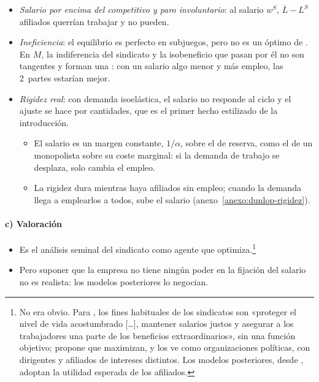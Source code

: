 \documentclass[11pt]{article}
\begin{document}
\begin{itemize}
\item \emph{Salario por encima del competitivo y paro involuntario}: al salario $w^S$, $\overline{L}-L^S$ afiliados querrían trabajar y no pueden.
\item \emph{Ineficiencia}: el equilibrio es perfecto en subjuegos, pero no es un óptimo de . En $M$, la indiferencia del sindicato y la isobeneficio que pasan por él no son tangentes y forman una : con un salario algo menor y más empleo, las 2~partes estarían mejor.
\item \emph{Rigidez real}: con demanda isoelástica, el salario no responde al ciclo y el ajuste se hace por cantidades, que es el primer hecho estilizado de la introducción.
  \begin{itemize}
  \item El salario es un margen constante, $1/\alpha$, sobre el de reserva, como el de un monopolista sobre su coste marginal: si la demanda de trabajo se desplaza, solo cambia el empleo.
  \item La rigidez dura mientras haya afiliados sin empleo; cuando la demanda llega a emplearlos a todos, sube el salario (anexo~\ref{anexo:dunlop-rigidez}).
  \end{itemize}
\end{itemize}

\paragraph{c) Valoración}

\begin{itemize}
\item Es el análisis seminal del sindicato como agente que optimiza.\footnote{No era obvio. Para \textcite[140]{Hicks1932Theory}, los fines habituales de los sindicatos son «proteger el nivel de vida acostumbrado […], mantener salarios justos y asegurar a los trabajadores una parte de los beneficios extraordinarios», sin una función objetivo; \textcite{Dunlop1944Wage} propone que maximizan, y \textcite{Ross1948Trade} los ve como organizaciones políticas, con dirigentes y afiliados de intereses distintos. Los modelos posteriores, desde \textcite{McDonaldSolow1981Wage}, adoptan la utilidad esperada de los afiliados\nocite{Oswald1985Economic}.}
\item Pero suponer que la empresa no tiene ningún poder en la fijación del salario no es realista: los modelos posteriores lo negocian.
\end{itemize}
\end{document}
